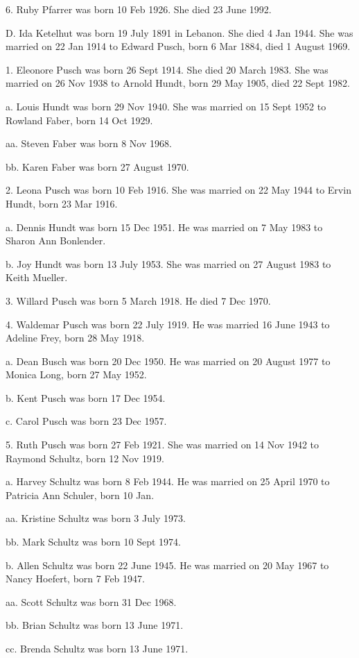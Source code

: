 \documentclass[a4paper]{article}
\begin{document}
6. Ruby Pfarrer was born 10 Feb 1926.  She died 23 June 1992.

D. Ida Ketelhut was born 19 July 1891 in Lebanon.  She died 4 Jan 1944.  She was married on 22 Jan 1914 to Edward Pusch, born 6 Mar 1884, died 1 August 1969.

1. Eleonore Pusch was born 26 Sept 1914.  She died 20 March 1983.  She was  married on 26 Nov 1938 to Arnold Hundt, born 29 May 1905, died 22 Sept 1982.

a. Louis Hundt was born 29 Nov 1940.   She was married on 15 Sept 1952 to Rowland Faber, born 14 Oct 1929.  

aa. Steven Faber was born 8 Nov 1968.

bb. Karen Faber was born 27 August 1970.

2. Leona Pusch was born 10 Feb 1916.  She was married on 22 May 1944 to Ervin Hundt, born 23 Mar 1916.

a. Dennis Hundt was born 15 Dec 1951.  He was married on 7 May 1983 to Sharon Ann Bonlender.

b. Joy Hundt was born 13 July 1953.  She was married on 27 August 1983 to Keith Mueller.

3. Willard Pusch was born 5 March 1918.  He died 7 Dec 1970.  

4. Waldemar Pusch was born 22 July 1919.  He was married 16 June 1943 to Adeline Frey, born 28 May 1918.

a. Dean Busch was born 20 Dec 1950.  He was married on 20 August 1977 to Monica Long, born 27 May 1952. 

b. Kent Pusch was born 17 Dec 1954.

c. Carol Pusch was born 23 Dec 1957.

5. Ruth Pusch was born 27 Feb 1921.  She was married on 14 Nov 1942 to Raymond Schultz, born 12 Nov 1919.

a. Harvey Schultz was born 8 Feb 1944.  He was married on 25 April 1970  to Patricia Ann Schuler, born 10 Jan.

aa. Kristine Schultz was born 3 July 1973.  

bb. Mark Schultz was born 10 Sept 1974.

b. Allen Schultz was born 22 June 1945.  He was married on 20 May  1967 to Nancy Hoefert, born 7 Feb 1947.

aa. Scott Schultz was born 31 Dec 1968.

bb. Brian Schultz was born 13 June 1971.

cc. Brenda Schultz was born 13 June 1971.
\end{document}
